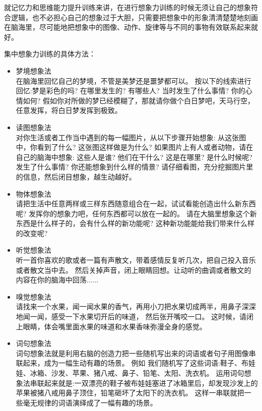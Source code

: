 \begin{itemize}
  就记忆力和思维能力提升训练来讲，在进行想象力训练的时候无须让自己的想象符合逻辑，也不必担心自己的想象过于大胆，只需要把想象中的形象清清楚楚地刻画在脑海里，尽可能地把想象中的图像、动作、旋律等与不同的事物有效联系起来就好。

  集中想象力训练的具体方法：
  \begin{itemize}
  \item 梦境想象法\\
    在脑海里回忆自己的梦境，不管是美梦还是噩梦都可以。
    按以下的线索进行回忆:梦是彩色的吗?
    在哪里发生的?
    有哪些人?
    当时发生了什么事情?
    你的心情如何?
    假如你对所做的梦已经模糊了，那就请你做个白日梦吧，天马行空，任意发挥，将白日梦发挥到极致。
  \item 读图想象法\\
    对你生活或者工作当中遇到的每一幅图片，从以下步骤开始想象:
    从这张图中，你看到了什么?
    这张图这样做是为什么?
    如果图片上有人或者动物，请在自己的脑海中想象:
    这些人是谁?
    他们在干什么?
    这是在哪里?
    是什么时候呢?
    发生了什么事情?
    你还能想象到什么样的情景?
    请仔细看图，充分挖掘图片里的信息，然后闭目想象，越生动越好。
  \item 物体想象法\\
    请把生活中任意两样或三样东西随意组合在一起，试试看能创造出什么新东西呢?
    发挥你的想象力吧，任何东西都可以放在一起的。
    请在大脑里想象这个新东西是什么样子的，会有什么样的新功能呢?
    这种新功能能给我们带来什么样的改变呢?
  \item 听觉想象法\\
    听一首你喜欢的歌或者一篇有声散文，带着感情反复听几次，把自己投入音乐或者散文当中去。
    然后关掉声音，闭上眼睛回想。让动听的曲调或者散文的内容在你的脑海中回荡......
  \item 嗅觉想象法\\
    请找来一个水果，闻一闻水果的香气，再用小刀把水果切成两半，用鼻子深深地闻一闻，感受一下水果切开后的味道， 然后张开嘴咬一口。
    这时候，请闭上眼睛，体会嘴里面水果的味道和水果香味弥漫全身的感觉。
  \item 词句想象法\\
    词句想象法就是利用右脑的创造力把一些随机写出来的词语或者句子用图像串联起来，成为一幅生动有趣的场景。
    例如 我们随机写了这些词语:鞋子、布娃娃、冰箱、沙发、苹果、猪八戒、鼻子、铅笔、太阳、洗衣机。
    运用词句想象法串联起来就是:一双漂亮的鞋子被布娃娃塞进了冰箱里后，却发现沙发上的苹果被猪八戒用鼻子顶住，铅笔砸坏了太阳下的洗衣机。
    这样一串联就把一些毫无规律的词语演绎成了一幅有趣的场景。
  \end{itemize}
  
\end{itemize}


